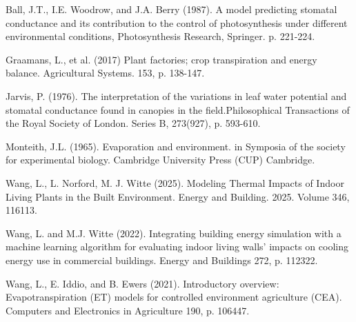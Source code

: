   Ball, J.T., I.E. Woodrow, and J.A. Berry (1987). A model predicting stomatal conductance and its contribution to the control of photosynthesis under different environmental conditions, Photosynthesis Research, Springer. p. 221-224.

  Graamans, L., et al. (2017) Plant factories; crop transpiration and energy balance. Agricultural Systems. 153, p. 138-147.

  Jarvis, P. (1976). The interpretation of the variations in leaf water potential and stomatal conductance found in canopies in the field.Philosophical Transactions of the Royal Society of London. Series B, 273(927), p. 593-610.

  Monteith, J.L. (1965). Evaporation and environment. in Symposia of the society for experimental biology. Cambridge University Press (CUP) Cambridge.

  Wang, L., L. Norford, M. J. Witte (2025). Modeling Thermal Impacts of Indoor Living Plants in the Built Environment. Energy and Building. 2025. Volume 346, 116113.

  Wang, L. and M.J. Witte (2022). Integrating building energy simulation with a machine learning algorithm for evaluating indoor living walls’ impacts on cooling energy use in commercial buildings. Energy and Buildings 272, p. 112322.

  Wang, L., E. Iddio, and B. Ewers (2021). Introductory overview: Evapotranspiration (ET) models for controlled environment agriculture (CEA). Computers and Electronics in Agriculture 190, p. 106447.
